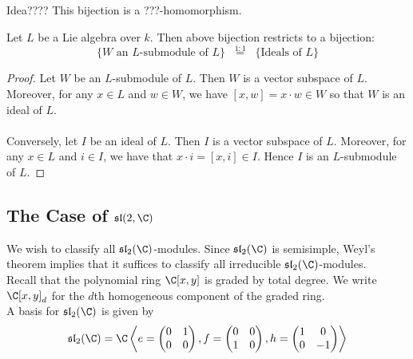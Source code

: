 \documentclass[a4paper]{article}
\begin{document}
Idea???? This bijection is a ???-homomorphism. 

\begin{lmm}{}{} Let $L$ be a Lie algebra over $k$. Then above bijection restricts to a bijection: $$\{W\text{ an }L\text{-submodule of }L\}\;\;\overset{1:1}{=}\;\;\{\text{Ideals of }L\}$$ \tcbline
\begin{proof}
Let $W$ be an $L$-submodule of $L$. Then $W$ is a vector subspace of $L$. Moreover, for any $x\in L$ and $w\in W$, we have $[x,w]=x\cdot w\in W$ so that $W$ is an ideal of $L$. \\~\\

Conversely, let $I$ be an ideal of $L$. Then $I$ is a vector subspace of $L$. Moreover, for any $x\in L$ and $i\in I$, we have that $x\cdot i=[x,i]\in I$. Hence $I$ is an $L$-submodule of $L$. 
\end{proof}
\end{lmm}

\subsection{The Case of $\mathfrak{sl}(2,\C)$}
We wish to classify all $\mathfrak{sl}_2(\C)$-modules. Since $\mathfrak{sl}_2(\C)$ is semisimple, Weyl's theorem implies that it suffices to classify all irreducible $\mathfrak{sl}_2(\C)$-modules. \\

Recall that the polynomial ring $\C[x,y]$ is graded by total degree. We write $\C[x,y]_d$ for the $d$th homogeneous component of the graded ring. \\

A basis for $\mathfrak{sl}_2(\C)$ is given by $$\mathfrak{sl}_2(\C)=\C\left\langle e=\begin{pmatrix}
0 & 1\\0 & 0
\end{pmatrix}, f=\begin{pmatrix}
0 & 0\\1 & 0
\end{pmatrix}, h=\begin{pmatrix}
1 & 0\\0 & -1
\end{pmatrix}\right\rangle$$
\end{document}

